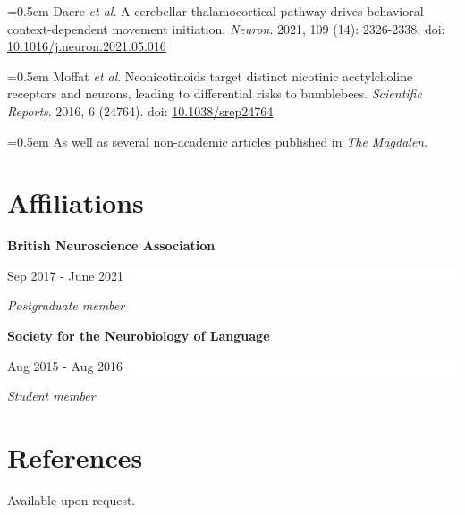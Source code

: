 \documentclass[paper=a4,fontsize=11pt]{scrartcl}
\newcommand{\sepspace}{\vspace*{1em}}
\newcommand{\ShortEntry}[3]{ %
		\noindent \textbf{#1} \hfill %
		\colorbox{White}{
            \parbox{9em}{
			\hfill\color{Black}#2}} \par %
		\noindent \textit{#3} \par} %
\begin{document}
\noindent\hangindent=0.5em \small Dacre \textit{et al}. A cerebellar-thalamocortical pathway drives behavioral context-dependent movement initiation. \textit{Neuron}. 2021, 109 (14): 2326-2338. doi: \href{https://doi.org/10.1016/j.neuron.2021.05.016}{10.1016/j.neuron.2021.05.016} \par
\sepspace

\noindent\hangindent=0.5em \small Moffat \textit{et al}. Neonicotinoids target distinct nicotinic acetylcholine receptors and neurons, leading to differential risks to bumblebees. \textit{Scientific Reports}. 2016, 6 (24764). doi: \href{https://www.nature.com/articles/srep24764}{10.1038/srep24764} \par
\sepspace

\noindent\hangindent=0.5em \small As well as several non-academic articles published in \href{https://issuu.com/themagdalen}{\textit{The Magdalen}}.




\section*{Affiliations}

\ShortEntry{British Neuroscience Association}{Sep 2017 - June 2021}{Postgraduate member}
\sepspace

\ShortEntry{Society for the Neurobiology of Language}{Aug 2015 - Aug 2016}{Student member}




\section*{References}
Available upon request.
\end{document}
